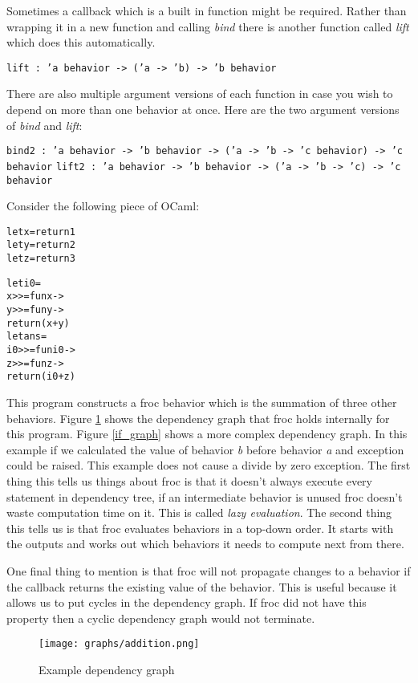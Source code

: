 Sometimes a callback which is a built in function might be required. Rather than wrapping it in a new function and calling \emph{bind} there is another function called \emph{lift} which does this automatically.

\texttt{lift : 'a behavior -> ('a -> 'b) -> 'b behavior}

There are also multiple argument versions of each function in case you wish to depend on more than one behavior at once. Here are the two argument versions of \emph{bind} and \emph{lift}:

\texttt{bind2 : 'a behavior -> 'b behavior -> ('a -> 'b -> 'c behavior) -> 'c behavior}
\texttt{lift2 : 'a behavior -> 'b behavior -> ('a -> 'b -> 'c) -> 'c behavior}

Consider the following piece of OCaml:


\begin{alltt}
let x = return 1
let y = return 2
let z = return 3

let i0 =
    x >>= fun x ->
        y >>= fun y ->
            return (x + y)
let ans =
    i0 >>= fun i0 ->
        z >>= fun z ->
            return (i0 + z)
\end{alltt}

This program constructs a froc behavior which is the summation of three other behaviors. Figure \ref{add_graph} shows the dependency graph that froc holds internally for this program. Figure \ref{if_graph} shows a more complex dependency graph. In this example if we calculated the value of behavior \emph{b} before behavior \emph{a} and exception could be raised. This example does not cause a divide by zero exception. The first thing this tells us things about froc is that it doesn't always execute every statement in dependency tree, if an intermediate behavior is unused froc doesn't waste computation time on it. This is called \emph{lazy evaluation}. The second thing this tells us is that froc evaluates behaviors in a top-down order. It starts with the outputs and works out which behaviors it needs to compute next from there.\cite{bib:froc}

One final thing to mention is that froc will not propagate changes to a behavior if the callback returns the existing value of the behavior. This is useful because it allows us to put cycles in the dependency graph. If froc did not have this property then a cyclic dependency graph would not terminate.

\begin{figure}
  \centering
  \texttt{[image: graphs/addition.png]}
  \caption{Example dependency graph}
  \label{add_graph}
\end{figure}

